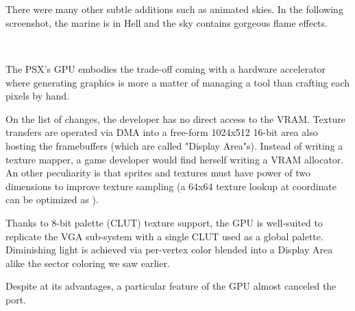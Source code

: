\\

\\
\par


There were many other subtle additions such as animated skies. In the following screenshot, the marine is in Hell and the sky contains gorgeous flame effects.\\
\par
{}\\
\par
The PSX's GPU embodies the trade-off coming with a hardware accelerator where generating graphics is more a matter of managing a tool than crafting each pixels by hand.\\
\par
On the list of changes, the developer has no direct access to the VRAM. Texture transfers are operated via DMA into a free-form 1024x512 16-bit area also hosting the framebuffers (which are called "Display Area"s). Instead of writing a texture mapper, a game developer would find herself writing a VRAM allocator. An other peculiarity is that sprites and textures must have power of two dimensions to improve texture sampling (a 64x64 texture lookup at coordinate  can be optimized as ).\\
\par
Thanks to 8-bit palette (CLUT) texture support, the GPU is well-suited to replicate the VGA sub-system with a single CLUT used as a global palette. Diminishing light is achieved via per-vertex color blended into a Display Area alike the sector coloring we saw earlier.\\
\par
Despite at its advantages, a particular feature of the GPU almost canceled the port.


